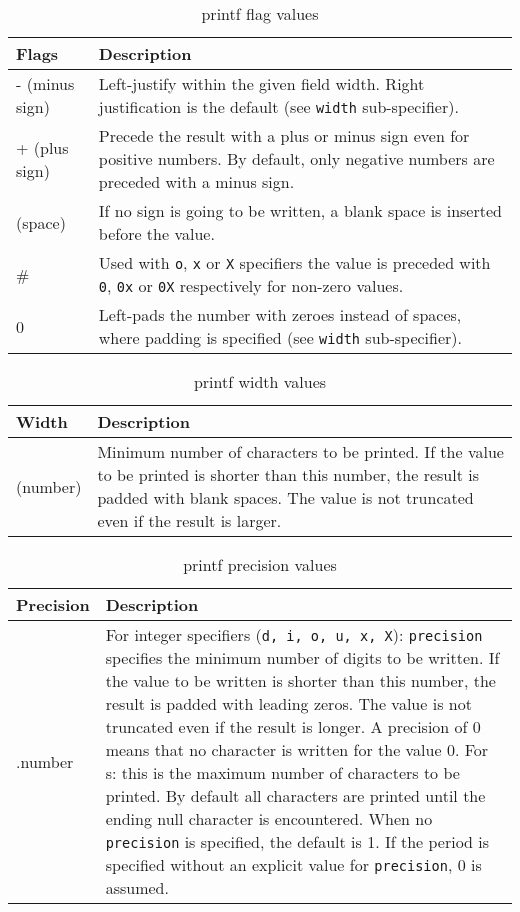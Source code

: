 \documentclass[twoside,english]{article}
\providecommand{\tabularnewline}{\\}
\begin{document}
\begin{table}[H]
\caption{printf flag values}
\begin{tabular}{|>{\raggedright}p{1.5in}|>{\raggedright}p{4.5in}|}
\hline
\textbf{Flags}&
\textbf{Description}\tabularnewline
\hline
\hline
- (minus sign)&
Left-justify within the given field width. Right justification is the default
(see \texttt{width} sub-specifier).\tabularnewline
\hline
+ (plus sign)&
Precede the result with a plus or minus sign even for positive numbers. By
default, only negative numbers are preceded with a minus sign.\tabularnewline
\hline
(space)&
If no sign is going to be written, a blank space is inserted before the value.\tabularnewline
\hline
\#&
Used with \texttt{o}, \texttt{x} or \texttt{X} specifiers the value is preceded
with \texttt{0}, \texttt{0x} or \texttt{0X} respectively for non-zero values.\tabularnewline
\hline
0&
Left-pads the number with zeroes instead of spaces, where padding is specified
(see \texttt{width} sub-specifier).\tabularnewline
\hline
\end{tabular}
\end{table}

\begin{table}[H]
\caption{printf width values}
\begin{tabular}{|>{\raggedright}p{1.5in}|>{\raggedright}p{4.5in}|}
\hline
\textbf{Width}&
\textbf{Description}\tabularnewline
\hline
\hline
(number)&
Minimum number of characters to be printed. If the value to be printed is
shorter than this number, the result is padded with blank spaces. The value
is not truncated even if the result is larger.\tabularnewline
\hline
\end{tabular}
\end{table}

%
\begin{table}[H]

\caption{printf precision values}

\begin{tabular}{|>{\raggedright}p{1.5in}|>{\raggedright}p{4.5in}|}
\hline
\textbf{Precision}&
\textbf{Description}\tabularnewline
\hline
\hline
.number&
For integer specifiers (\texttt{d, i, o, u, x, X}): \texttt{precision} specifies
the minimum number of digits to be written. If the value to be written is
shorter than this number, the result is padded with leading zeros. The value
is not truncated even if the result is longer. A precision of 0 means that
no character is written for the value 0. For s: this is the maximum number
of characters to be printed. By default all characters are printed until
the ending null character is encountered. When no \texttt{precision} is specified,
the default is 1. If the period is specified without an explicit value for
\texttt{precision}, 0 is assumed.\tabularnewline
\hline
\end{tabular}
\end{table}
\end{document}
